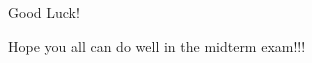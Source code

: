 \documentclass{beamer}
\begin{document}
\begin{frame}{Good Luck!}
    \begin{LARGE}
        \begin{center}
            Hope you all can do well in the midterm exam!!!
        \end{center}

    \end{LARGE}
\end{frame}
\end{document}
